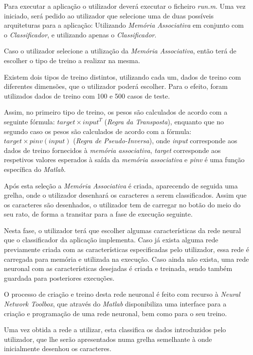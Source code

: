 \documentclass{article}
\begin{document}
Para executar a aplicação o utilizador deverá executar o ficheiro \emph{run.m}. Uma vez iniciado, será pedido ao utilizador que selecione uma de duas possíveis arquiteturas para a aplicação: Utilizando \emph{Memória Associativa} em conjunto com o \emph{Classificador}, e utilizando apenas o \emph{Classificador}.

Caso o utilizador selecione a utilização da \emph{Memória Associativa}, então terá de escolher o tipo de treino a realizar na mesma.

Existem dois tipos de treino distintos, utilizando cada um, dados de treino com diferentes dimensões, que o utilizador poderá escolher. Para o efeito, foram utilizados dados de treino com 100 e 500 casos de teste.

Assim, no primeiro tipo de treino, os pesos são calculados de acordo com a seguinte fórmula: $target\times input^T$ (\emph{Regra da Transposta}), enquanto que no segundo caso os pesos são calculados de acordo com a fórmula: $target\times pinv(input)$ (\emph{Regra de Pseudo-Inversa}), onde \emph{input} corresponde aos dados de treino fornecidos à \emph{memória associativa}, \emph{target} corresponde aos respetivos valores esperados à saída da \emph{memória associativa} e \emph{pinv} é uma função específica do \emph{Matlab}.

Após esta seleção a \emph{Memória Associativa} é criada, aparecendo de seguida uma grelha, onde o utilizador desenhará os caracteres a serem classificados. Assim que os caracteres são desenhados, o utilizador tem de carregar no botão do meio do seu rato, de forma a transitar para a fase de execução seguinte.

Nesta fase, o utilizador terá que escolher algumas características da rede neural que o classificador da aplicação implementa. Caso já exista alguma rede previamente criada com as características especificadas pelo utilizador, essa rede é carregada para memória e utilizada na execução. Caso ainda não exista, uma rede neuronal com as características desejadas é criada e treinada, sendo também guardada para posteriores execuções. 

O processo de criação e treino desta rede neuronal é feito com recurso à \emph{Neural Network Toolbox}, que através do \emph{Matlab} disponibiliza uma interface para a criação e programação de uma rede neuronal, bem como para o seu treino.

Uma vez obtida a rede a utilizar, esta classifica os dados introduzidos pelo utilizador, que lhe serão apresentados numa grelha semelhante à onde inicialmente desenhou os caracteres.
\end{document}
